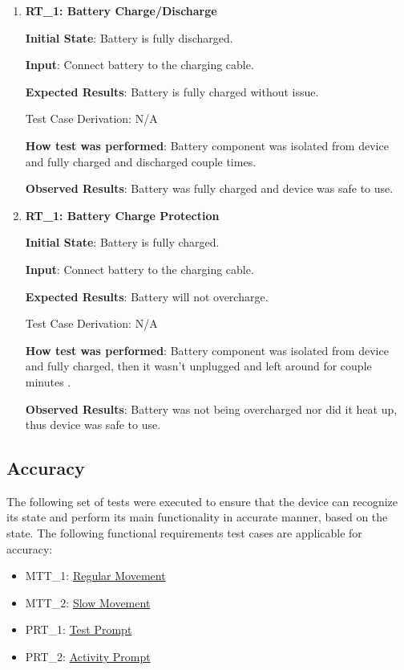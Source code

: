 \documentclass[12pt, titlepage]{article}
\begin{document}
\begin{enumerate}


  \item{\textbf{RT\_1: Battery Charge/Discharge}}\label{RT1}

  \textbf{Initial State}: Battery is fully discharged.

  \textbf{Input}: Connect battery to the charging cable.

  \textbf{Expected Results}: Battery is fully charged without issue.

  Test Case Derivation: N/A

  \textbf{How test was performed}: Battery component was isolated from device and fully charged and discharged couple times.

  \textbf{Observed Results}: Battery was fully charged and device was safe to use.

  \item{\textbf{RT\_1: Battery Charge Protection}}\label{RT1}

  \textbf{Initial State}: Battery is fully charged.

  \textbf{Input}: Connect battery to the charging cable.

  \textbf{Expected Results}: Battery will not overcharge.

  Test Case Derivation: N/A

  \textbf{How test was performed}: Battery component was isolated from device and fully charged, then it wasn't unplugged and left around for couple minutes .

  \textbf{Observed Results}: Battery was not being overcharged nor did it heat up, thus device was safe to use.

\end{enumerate}

\subsection{Accuracy}
The following set of tests were executed to ensure that the device can recognize its state and perform its main functionality in accurate manner, based on the state.
The following functional requirements test cases are applicable for accuracy:

\begin{itemize}
  \item MTT\_1: \hyperref[MTT1]{Regular Movement}
  \item MTT\_2: \hyperref[MTT2]{Slow Movement}
  \item PRT\_1: \hyperref[PRT1]{Test Prompt}
  \item PRT\_2: \hyperref[PRT2]{Activity Prompt}
\end{itemize}
\end{document}
